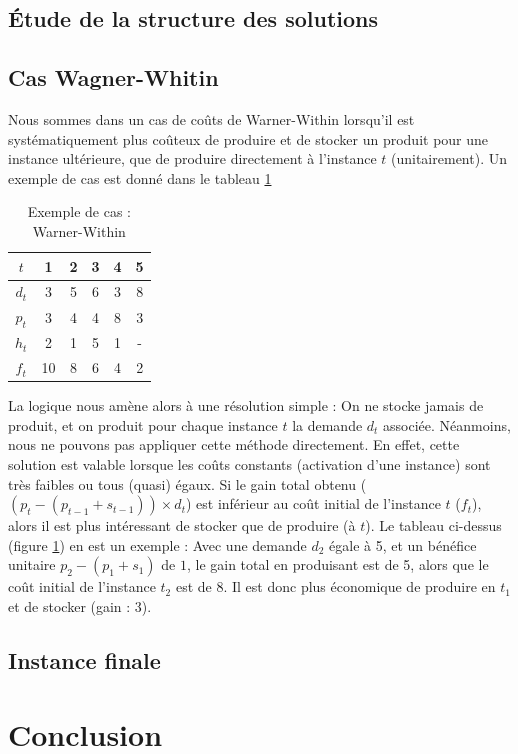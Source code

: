 \documentclass[a4paper,11pt,twoside]{report}
\begin{document}
\section{Étude de la structure des solutions}



\section{Cas Wagner-Whitin}
Nous sommes dans un cas de coûts de Warner-Within lorsqu'il est systématiquement plus coûteux de produire et de stocker un produit pour une instance ultérieure, que de produire directement à l'instance $t$ (unitairement).
Un exemple de cas est donné dans le tableau \ref{warner1}
\begin{table}[h]
  \centering
 \begin{tabular}{|c|ccccc|}
\hline
$t$&1&2&3&4&5\\\hline\hline
$d_t$&3&5&6&3&8\\
$p_t$&3&4&4&8&3\\
$h_t$&2&1&5&1&-\\
$f_t$&10&8&6&4&2\\\hline
\end{tabular}
 \caption{Exemple de cas : Warner-Within}
 \label{warner1}
\end{table}

La logique nous amène alors à une résolution simple : On ne stocke jamais de produit, et on produit pour chaque instance $t$ la demande $d_t$ associée. Néanmoins, nous ne pouvons pas appliquer cette méthode directement.
En effet, cette solution est valable lorsque les coûts constants (activation d'une instance) sont très faibles ou tous (quasi) égaux. Si le gain total obtenu ($(p_t-(p_{t-1}+s_{t-1}))\times d_t$) est inférieur au coût initial de l'instance $t$ ($f_t$), alors il est plus intéressant de stocker que de produire (à $t$).
Le tableau ci-dessus (figure \ref{warner1}) en est un exemple : Avec une demande $d_2$ égale à 5, et un bénéfice unitaire $p_2-(p_1+s_1)$ de $1$, le gain total en produisant est de 5, alors que le coût initial de l'instance $t_2$ est de 8. Il est donc plus économique de produire en $t_1$ et de stocker (gain : 3).

\section{Instance finale}


\chapter{Conclusion}
\end{document}
